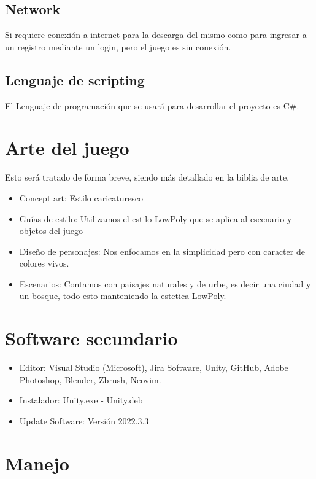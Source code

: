 \subsection{Network}
Si requiere conexión a internet para la descarga del mismo como para ingresar a un registro mediante
un login, pero el juego es sin conexión.
\subsection{Lenguaje de scripting}
El Lenguaje de programación que se usará para desarrollar el proyecto es C\#.

\section{Arte del juego}

Esto será tratado de forma breve, siendo más detallado en la biblia de arte.

\begin{itemize}
	\item Concept art: Estilo caricaturesco
	\item Guías de estilo: Utilizamos el estilo LowPoly que se aplica al escenario y objetos del juego
	\item Diseño de personajes: Nos enfocamos en la simplicidad pero con caracter de colores vivos.
	\item Escenarios: Contamos con paisajes naturales y de urbe, es decir una ciudad y un bosque, todo esto
	      manteniendo la estetica LowPoly.
\end{itemize}

\section{Software secundario}
\begin{itemize}
	\item Editor: Visual Studio (Microsoft), Jira Software, Unity, GitHub, Adobe Photoshop, Blender, Zbrush,
	      Neovim.
	\item Instalador: Unity.exe - Unity.deb
	\item Update Software: Versión 2022.3.3
\end{itemize}

\section{Manejo}
